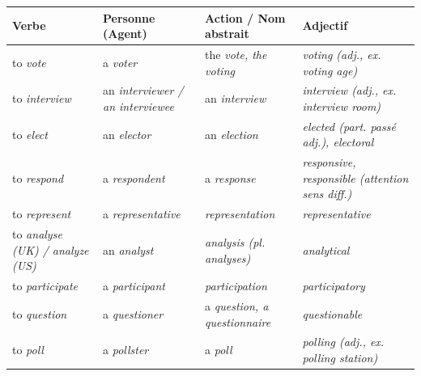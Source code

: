 \documentclass[11pt]{article}
\newcommand{\eng}[1]{\ifmmode\text{\textit{#1}}\else\begingroup\selectlanguage{english}\itshape #1\endgroup\fi}
\begin{document}
\begin{propriete}
\begin{center}
\begin{tabular}{|l|l|l|l|}
\hline
\rowcolor{popblueL} \textbf{Verbe} & \textbf{Personne (Agent)} & \textbf{Action / Nom abstrait} & \textbf{Adjectif} \\
\hline
to \eng{vote} & a \eng{voter} & the \eng{vote}, the \eng{voting} & \eng{voting} (adj., ex. \eng{voting age}) \\
\hline
to \eng{interview} & an \eng{interviewer} / an \eng{interviewee} & an \eng{interview} & \eng{interview} (adj., ex. \eng{interview room}) \\
\hline
to \eng{elect} & an \eng{elector} & an \eng{election} & \eng{elected} (part. passé adj.), \eng{electoral} \\
\hline
to \eng{respond} & a \eng{respondent} & a \eng{response} & \eng{responsive}, \eng{responsible} (attention sens diff.) \\
\hline
to \eng{represent} & a \eng{representative} & \eng{representation} & \eng{representative} \\
\hline
to \eng{analyse} (UK) / \eng{analyze} (US) & an \eng{analyst} & \eng{analysis} (pl. \eng{analyses}) & \eng{analytical} \\
\hline
to \eng{participate} & a \eng{participant} & \eng{participation} & \eng{participatory} \\
\hline
to \eng{question} & a \eng{questioner} & a \eng{question}, a \eng{questionnaire} & \eng{questionable} \\
\hline
to \eng{poll} & a \eng{pollster} & a \eng{poll} & \eng{polling} (adj., ex. \eng{polling station}) \\
\hline
\end{tabular}
\end{center}
\end{propriete}
\end{document}
